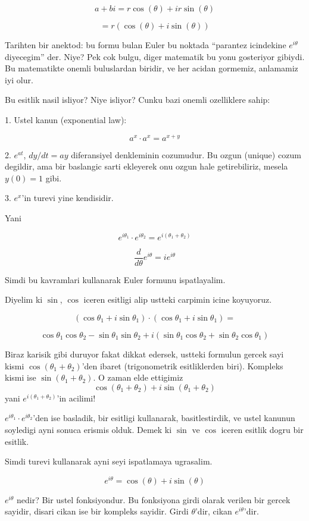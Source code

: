 \documentclass[12pt,fleqn]{article}\usepackage{../common}
\begin{document}
\[ a+bi = r\cos(\theta) + ir\sin(\theta) \]

\[ = r (\cos(\theta) + i\sin(\theta)) \]

Tarihten bir anektod: bu formu bulan Euler bu noktada ``parantez icindekine
$e^{i\theta}$ diyecegim'' der. Niye? Pek cok bulgu, diger matematik bu yonu
gosteriyor gibiydi. Bu matematikte onemli buluslardan biridir, ve her
acidan gormemiz, anlamamiz iyi olur. 

Bu esitlik nasil isliyor? Niye isliyor? Cunku bazi onemli ozelliklere sahip:

1. Ustel kanun (exponential law):

\[ a^x \cdot a^x = a^{x+y} \]

2. $e^{at}$, $dy/dt = ay$ diferansiyel denkleminin cozumudur. Bu ozgun
(unique) cozum degildir, ama bir baslangic sarti ekleyerek onu ozgun hale
getirebiliriz, mesela $y(0)=1$ gibi.

3. $e^x$'in turevi yine kendisidir. 

Yani

\[ e^{i\theta_1} \cdot  e^{i\theta_2} = e^{i(\theta_1 + \theta_2)}\]

\[ \frac{d}{d\theta} e^{i\theta} = i e^{i\theta} \]

Simdi bu kavramlari kullanarak Euler formunu ispatlayalim. 

Diyelim ki $\sin$, $\cos$ iceren esitligi alip ustteki carpimin icine
koyuyoruz.

\[ 
(\cos\theta_1 + i\sin\theta_1) \cdot (\cos\theta_1 + i\sin\theta_1) =
\] 

\[  
\cos\theta_1\cos\theta_2 - \sin\theta_1\sin\theta_2 +
i(\sin\theta_1\cos\theta_2 + \sin\theta_2\cos\theta_1 )
\] 

Biraz karisik gibi duruyor fakat dikkat edersek, ustteki formulun gercek
sayi kismi $\cos(\theta_1 + \theta_2)$'den ibaret (trigonometrik esitliklerden biri). 
Kompleks kismi ise $\sin(\theta_1 + \theta_2)$. O zaman elde ettigimiz \[
\cos(\theta_1+\theta_2) + i\sin(\theta_1+\theta_2) \] 
yani $e^{i(\theta_1+\theta_2)}$'in acilimi!

$e^{i\theta_1} \cdot e^{i\theta_2}$'den ise basladik, bir esitligi kullanarak, basitlestirdik, 
ve ustel kanunun soyledigi ayni sonuca erismis olduk. Demek ki $\sin$ ve $\cos$ 
iceren esitlik dogru bir esitlik.

Simdi turevi kullanarak ayni seyi ispatlamaya ugrasalim. 

\[ e^{i\theta} = \cos(\theta) + i\sin(\theta) \]

$e^{i\theta}$ nedir? Bir ustel fonksiyondur. Bu fonksiyona girdi olarak
verilen bir gercek sayidir, disari cikan ise bir kompleks sayidir. Girdi
$\theta$'dir, cikan $e^{i\theta}$'dir.
\end{document}
